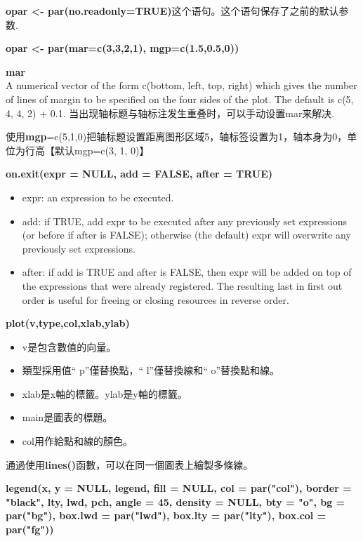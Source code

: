 \documentclass[11pt,a4paper,oneside]{book}
\begin{document}
\textbf{opar <- par(no.readonly=TRUE)}这个语句。这个语句保存了之前的默认参数.

\begin{tcolorbox}[colback=pink!10!white,colframe=pink!100!black]
\textbf{opar <- par(mar=c(3,3,2,1), mgp=c(1.5,0.5,0))}

\textbf{mar}\\
A numerical vector of the form c(bottom, left, top, right) which gives the number of lines of margin to be specified on the four sides of the plot. The default is c(5, 4, 4, 2) + 0.1.
当出现轴标题与轴标注发生重叠时，可以手动设置mar来解决.

使用\textbf{mgp}=c(5,1,0)把轴标题设置距离图形区域5，轴标签设置为1，轴本身为0，单位为行高【默认mgp=c(3, 1, 0)】
\end{tcolorbox}

\begin{tcolorbox}[colback=pink!10!white,colframe=pink!100!black]
\textbf{	on.exit(expr = NULL, add = FALSE, after = TRUE)}
	\begin{itemize}
		\item expr: an expression to be executed.
		\item add: if TRUE, add expr to be executed after any previously set expressions (or before if after is FALSE); otherwise (the default) expr will overwrite any previously set expressions.
		\item after: if add is TRUE and after is FALSE, then expr will be added on top of the expressions that were already registered. The resulting last in first out order is useful for freeing or closing resources in reverse order.
	\end{itemize}
\end{tcolorbox}

\begin{tcolorbox}[colback=pink!10!white,colframe=pink!100!black]
	\textbf{plot(v,type,col,xlab,ylab)}
	\begin{itemize}
		\item v是包含數值的向量。
		\item 類型採用值“ p”僅替換點，“ l”僅替換線和“ o”替換點和線。
		\item xlab是x軸的標籤。ylab是y軸的標籤。
		\item main是圖表的標題。
		\item col用作給點和線的顏色。
	\end{itemize}

通過使用\textbf{lines()}函數，可以在同一個圖表上繪製多條線。
\end{tcolorbox}
\textbf{legend(x, y = NULL, legend, fill = NULL, col = par("col"),
border = "black", lty, lwd, pch,
angle = 45, density = NULL, bty = "o", bg = par("bg"),
box.lwd = par("lwd"), box.lty = par("lty"), box.col = par("fg"))}\\
\end{document}
